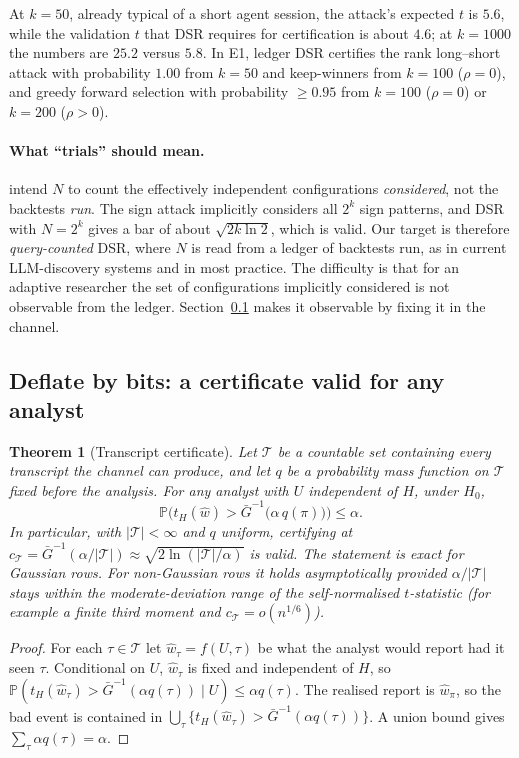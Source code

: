 \documentclass[11pt]{article}
\newtheorem{theorem}{Theorem}
\theoremstyle{definition}
\theoremstyle{remark}
\newcommand{\Prob}{\mathbb{P}}
\newcommand{\tH}{t_{H}}
\newcommand{\cT}{\mathcal{T}}
\begin{document}
At $k=50$, already typical of a short agent session, the attack's expected $t$ is $5.6$, while the validation $t$ that DSR requires for certification is about $4.6$; at $k=1000$ the numbers are $25.2$ versus $5.8$. In E1, ledger DSR certifies the rank long--short attack with probability $1.00$ from $k=50$ and keep-winners from $k=100$ ($\rho=0$), and greedy forward selection with probability $\ge0.95$ from $k=100$ ($\rho=0$) or $k=200$ ($\rho>0$).

\paragraph{What ``trials'' should mean.} \citet{bailey2014deflated} intend $N$ to count the effectively independent configurations \emph{considered}, not the backtests \emph{run}. The sign attack implicitly considers all $2^k$ sign patterns, and DSR with $N=2^k$ gives a bar of about $\sqrt{2k\ln2}$, which is valid. Our target is therefore \emph{query-counted} DSR, where $N$ is read from a ledger of backtests run, as in current LLM-discovery systems \citep{gencay2026honest} and in most practice. The difficulty is that for an adaptive researcher the set of configurations implicitly considered is not observable from the ledger. Section~\ref{sec:bits} makes it observable by fixing it in the channel.

\subsection{Deflate by bits: a certificate valid for any analyst}\label{sec:bits}

\begin{theorem}[Transcript certificate]\label{thm:transcript}
Let $\cT$ be a countable set containing every transcript the channel can produce, and let $q$ be a probability mass function on $\cT$ fixed before the analysis. For any analyst with $U$ independent of $H$, under $H_0$,
\[\Prob\Big(\tH(\hat w)>\bar G^{-1}\big(\alpha\,q(\pi)\big)\Big)\le\alpha.\]
In particular, with $|\cT|<\infty$ and $q$ uniform, certifying at $c_\cT=\bar G^{-1}(\alpha/|\cT|)\approx\sqrt{2\ln(|\cT|/\alpha)}$ is valid. The statement is exact for Gaussian rows. For non-Gaussian rows it holds asymptotically provided $\alpha/|\cT|$ stays within the moderate-deviation range of the self-normalised $t$-statistic (for example a finite third moment and $c_\cT=o(n^{1/6})$).
\end{theorem}
\begin{proof}
For each $\tau\in\cT$ let $\hat w_\tau=f(U,\tau)$ be what the analyst would report had it seen $\tau$. Conditional on $U$, $\hat w_\tau$ is fixed and independent of $H$, so $\Prob(\tH(\hat w_\tau)>\bar G^{-1}(\alpha q(\tau))\mid U)\le\alpha q(\tau)$. The realised report is $\hat w_\pi$, so the bad event is contained in $\bigcup_\tau\{\tH(\hat w_\tau)>\bar G^{-1}(\alpha q(\tau))\}$. A union bound gives $\sum_\tau\alpha q(\tau)=\alpha$.
\end{proof}
\end{document}
